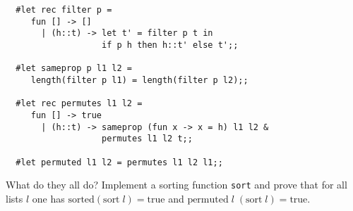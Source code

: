 \begin{enumerate}
\begin{boxed}
\begin{verbatim}
  #let rec filter p =
     fun [] -> []
       | (h::t) -> let t' = filter p t in
                   if p h then h::t' else t';;

  #let sameprop p l1 l2 =
     length(filter p l1) = length(filter p l2);;

  #let rec permutes l1 l2 =
     fun [] -> true
       | (h::t) -> sameprop (fun x -> x = h) l1 l2 &
                   permutes l1 l2 t;;

  #let permuted l1 l2 = permutes l1 l2 l1;;
\end{verbatim}\end{boxed}

\noindent What do they all do? Implement a sorting function {\tt sort} and
prove that for all lists $l$ one has $\mbox{sorted}(\mbox{sort}\; l) =
\mbox{true}$ and $\mbox{permuted}\; l\; (\mbox{sort}\; l) = \mbox{true}$.

\end{enumerate}
